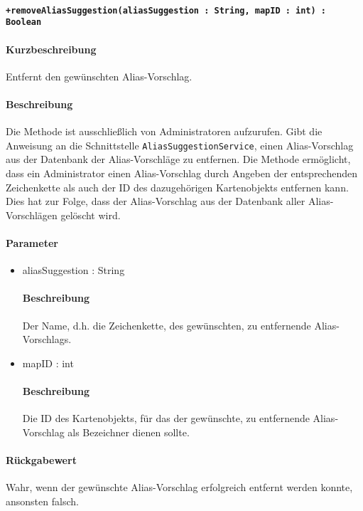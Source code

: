 \paragraph*{\texttt{+removeAliasSuggestion(aliasSuggestion : String, mapID : int) : Boolean}}%
\paragraph*{Kurzbeschreibung}
Entfernt den gewünschten Alias-Vorschlag.
\paragraph*{Beschreibung}
Die Methode ist ausschließlich von Administratoren aufzurufen.
Gibt die Anweisung an die Schnittstelle \texttt{AliasSuggestionService}, einen Alias-Vorschlag aus der Datenbank der Alias-Vorschläge zu entfernen.
Die Methode ermöglicht, dass ein Administrator einen Alias-Vorschlag durch Angeben der entsprechenden Zeichenkette als auch der ID des dazugehörigen Kartenobjekts entfernen kann.
Dies hat zur Folge, dass der Alias-Vorschlag aus der Datenbank aller Alias-Vorschlägen gelöscht wird.
\paragraph*{Parameter}
\begin{itemize}
	\item aliasSuggestion : String
		\paragraph*{Beschreibung}
		Der Name, d.h. die Zeichenkette, des gewünschten, zu entfernende Alias-Vorschlags.
	\item mapID : int
		\paragraph*{Beschreibung}
		Die ID des Kartenobjekts, für das der gewünschte, zu entfernende Alias-Vorschlag als Bezeichner dienen sollte.
\end{itemize}
\paragraph*{Rückgabewert}
Wahr, wenn der gewünschte Alias-Vorschlag erfolgreich entfernt werden konnte, ansonsten falsch.
